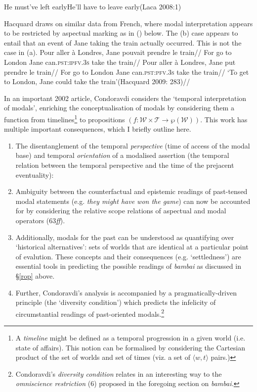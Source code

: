\documentclass[12pt]{article}
\newcommand{\la}{\langle}
\newcommand{\ra}{\rangle}
\begin{document}
\pex\a He must've left early\a He'll have to leave early\hfill(Laca 2008:1)\xe

Hacquard draws on similar data from French, where modal interpretation appears to be restricted by aspectual marking as in (\nextx) below. The (b) case appears to entail that an event of Jane taking the train actually occurred. This is not the case in (a).
\pex\a\begingl\gla Pour aller à Londres, Jane pouvait prendre le train//
\glb For go to London Jane can.\textsc{pst:ipfv.3s} take the train//
\endgl
\a\begingl\gla Pour aller à Londres, Jane put prendre le train//
\glb For go to London Jane can.\textsc{pst:pfv.3s} take the train//
\glft`To get to London, Jane could take the train'\hfill(Hacquard 2009: 283)//\endgl\xe


In an important 2002 article, Condoravdi considers the `temporal interpretation of modals', enriching the conceptualisation of modals by considering them a function from timelines\footnote{A \textit{timeline} might be defined as a temporal progression in a given world (i.e. state of affairs). This notion can be formalised by considering the Cartesian product of the set of worlds and set of times (viz. a set of $\la w,t\ra$ pairs.)} to propositions ${(f:\mathcal{W\times T\to\wp(W)})}$. This work has multiple important consequences, which I briefly outline here. 
\begin{enumerate}[label={\bf\roman*.}]
	\item The disentanglement of the temporal \textit{perspective} (time of access of the modal base) and temporal \textit{orientation} of a modalised assertion (the temporal relation between the temporal perspective and the time of the prejacent eventuality):
	\item Ambiguity between the counterfactual and epistemic readings of past-tensed modal statements (e.g. \textit{they might have won the game}) can now be accounted for by considering the relative scope relations of aspectual and modal operators (63\textit{ff}). \item Additionally, modals for the past can be understood as quantifying over `historical alternatives': sets of worlds that are identical at a particular point of evalution. These concepts and their consequences (e.g. `settledness') are essential tools in predicting the possible readings of \textit{bambai} as discussed in §\ref{rop} above.
	\item  Further, Condoravdi's analysis is accompanied by a pragmatically-driven principle (the `diversity condition') which predicts the infelicity of circumstantial readings of past-oriented modals.\footnote{Condoravdi's \textit{diversity condition} relates in an interesting way to the \textit{omniscience restriction} (6) proposed in the foregoing section on \textit{bambai.}}\end{enumerate}
\end{document}
